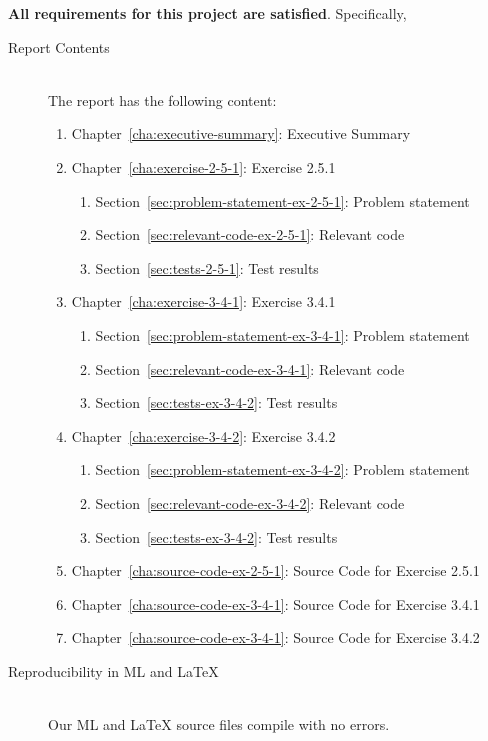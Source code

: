 \documentclass{report}
\begin{document}
\textbf{All requirements for this project are satisfied}.
Specifically,
\begin{description}
\item[Report Contents] \ \\
  The report has the following content:
  \begin{enumerate}[{}]
  \item Chapter~\ref{cha:executive-summary}: Executive Summary
  \item Chapter~\ref{cha:exercise-2-5-1}: Exercise 2.5.1
    \begin{enumerate}[{}]
    \item Section~\ref{sec:problem-statement-ex-2-5-1}: Problem statement
    \item Section~\ref{sec:relevant-code-ex-2-5-1}: Relevant code
    \item Section~\ref{sec:tests-2-5-1}: Test results
    \end{enumerate}
  \item Chapter~\ref{cha:exercise-3-4-1}: Exercise 3.4.1
    \begin{enumerate}[{}]
    \item Section~\ref{sec:problem-statement-ex-3-4-1}: Problem statement
    \item Section~\ref{sec:relevant-code-ex-3-4-1}: Relevant code
    \item Section~\ref{sec:tests-ex-3-4-2}: Test results
    \end{enumerate}
  \item Chapter~\ref{cha:exercise-3-4-2}: Exercise 3.4.2
    \begin{enumerate}[{}]
    \item Section~\ref{sec:problem-statement-ex-3-4-2}: Problem statement
    \item Section~\ref{sec:relevant-code-ex-3-4-2}: Relevant code
    \item Section~\ref{sec:tests-ex-3-4-2}: Test results
    \end{enumerate}
  \item Chapter~\ref{cha:source-code-ex-2-5-1}: Source Code for Exercise
    2.5.1
  \item Chapter~\ref{cha:source-code-ex-3-4-1}: Source Code for Exercise
    3.4.1
  \item Chapter~\ref{cha:source-code-ex-3-4-1}: Source Code for Exercise
    3.4.2
  \end{enumerate}
\item[Reproducibility in ML and \LaTeX{}] \ \\
  Our ML and \LaTeX{} source files compile with no errors.
\end{description}
\end{document}
